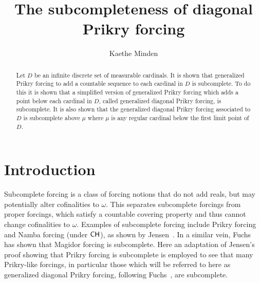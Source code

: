 \documentclass{amsart}
\theoremstyle{definition}
\theoremstyle{remark}
\newcommand{\CH}{\textup{\textsf{CH}}}
\begin{document}
\title{The subcompleteness of diagonal Prikry forcing}

\author{Kaethe Minden}
 \address[K.~Minden]{Mathematics, Marlboro College, 2582 South Road, Marlboro, VT 05344}
\date{}     					

\begin{abstract}
Let \(D\) be an infinite discrete set of measurable cardinals. It is shown that generalized Prikry forcing to add a countable sequence to each cardinal in \(D\) is subcomplete. To do this it is shown that a simplified version of generalized Prikry forcing which adds a point below each cardinal in \(D\), called generalized diagonal Prikry forcing, is subcomplete. It is also shown that the generalized diagonal Prikry forcing associated to \(D\) is subcomplete above $\mu$ where $\mu$ is any regular cardinal below the first limit point of \(D\).
\end{abstract}
\maketitle

\section{Introduction}
Subcomplete forcing is a class of forcing notions that do not add reals, but may potentially alter cofinalities to $\omega$. 
This separates subcomplete forcings from proper forcings, which satisfy a countable covering property and thus cannot change cofinalities to $\omega$. 
Examples of subcomplete forcing include Prikry forcing and Namba forcing (under $\CH$), as shown by Jensen~\cite[Section 3.3]{Jensen:2012fr}. 
In a similar vein, Fuchs~\cite{Fuchs:2017Magidor} has shown that Magidor forcing is subcomplete. Here an adaptation of Jensen's proof showing that Prikry forcing is subcomplete is employed to see that many Prikry-like forcings, in particular those which will be referred to here as generalized diagonal Prikry forcing, following Fuchs~\cite{Fuchs:2005kx}, are subcomplete.
\end{document}
